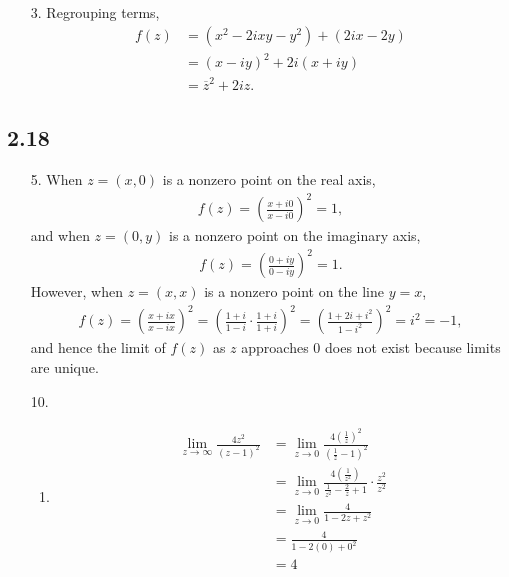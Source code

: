 \documentclass[a4paper,12pt]{article}
\begin{document}
\begin{enumerate}
    \item[3.]
        Regrouping terms,
        \begin{align*}
            f(z) &= (x^2 - 2ixy - y^2) + (2ix - 2y) \\
            &= (x - iy)^2 + 2i(x + iy) \\
            &= \overline{z}^2 + 2iz.
        \end{align*}
\end{enumerate}

\subsection*{2.18}
\begin{enumerate}
    \item[5.]
        When $z = (x, 0)$ is a nonzero point on the real axis,
        \begin{align*}
            f(z) = \left( \frac{x + i0}{x - i0} \right)^2 = 1,
        \end{align*}
        and when $z = (0, y)$ is a nonzero point on the imaginary axis,
        \begin{align*}
            f(z) = \left( \frac{0 + iy}{0 - iy} \right)^2 = 1.
        \end{align*}
        However, when $z = (x, x)$ is a nonzero point on the line $y = x$,
        \begin{align*}
            f(z) = \left( \frac{x + ix}{x - ix} \right)^2 = \left( \frac{1 + i}{1 - i} \cdot \frac{1 + i}{1 + i} \right)^2 = \left( \frac{1 + 2i + i^2}{1 - i^2} \right)^2 = i^2 = -1,
        \end{align*}
        and hence the limit of $f(z)$ as $z$ approaches $0$ does not exist because limits are unique.

    \item[10.]
        \begin{enumerate}
            \item
                \begin{align*}
                    \lim_{z \to \infty} \frac{4z^2}{(z - 1)^2} &= \lim_{z \to 0} \frac{4 \left( \frac{1}{z} \right)^2}{\left( \frac{1}{z} - 1 \right)^2} \\
                    &= \lim_{z \to 0} \frac{4 \left( \frac{1}{z^2} \right)}{\frac{1}{z^2} - \frac{2}{z} + 1} \cdot \frac{z^2}{z^2} \\
                    &= \lim_{z \to 0} \frac{4}{1 - 2z + z^2} \\
                    &= \frac{4}{1 - 2(0) + 0^2} \\
                    &= 4
                \end{align*}


\end{enumerate}
\end{enumerate}
\end{document}
